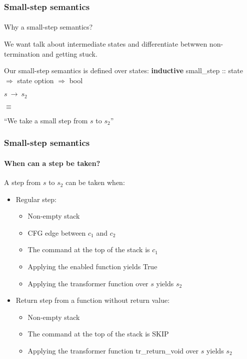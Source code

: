 \begin{frame}
\frametitle{Small-step semantics}
\framesubtitle{}

Why a small-step semantics?
\bigskip
\pause

We want talk about intermediate states and differentiate betwwen non-termination and getting stuck.

\bigskip
\pause


\begin{block}{Our small-step semantics is defined over states:}
\textbf{inductive} small\_step :: state $\Rightarrow$ state option $\Rightarrow$ bool
\bigskip

$s\ \rightarrow\ s_2$

$\equiv$

``We take a small step from $s$ to $s_2$''
\end{block}


\end{frame}


\begin{frame}
\frametitle{Small-step semantics}
\framesubtitle{When can a step be taken?}

A step from $s$ to $s_2$ can be taken when:
\begin{itemize}
\item{Regular step:}
\begin{itemize}
\item{Non-empty stack}
\item{CFG edge between $c_1$ and $c_2$}
\item{The command at the top of the stack is $c_1$}
\item{Applying the enabled function yields True}
\item{Applying the transformer function over $s$ yields $s_2$}
\end{itemize}
\item{Return step from a function without return value:}
\begin{itemize}
\item{Non-empty stack}
\item{The command at the top of the stack is SKIP}
\item{Applying the transformer function tr\_return\_void over $s$ yields $s_2$}
\end{itemize}
\end{itemize}

\end{frame}



